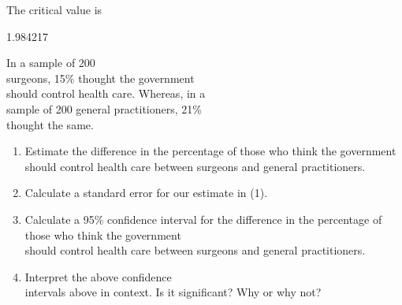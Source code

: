 \documentclass[11pt, chapterprefix=true]{scrbook}\usepackage[]{graphicx}\usepackage[]{color}
\begin{document}
\begin{exercises}
\begin{solution}
   The critical value is


  1.984217

  \end{solution}

  \begin{exercise} %

In a sample of 200 \\ surgeons, 15\% thought the government \\ should control health care.  Whereas, in a \\ sample of 200 general practitioners, 21\% \\ thought the same.

\begin{enumerate}
\item Estimate the difference in the percentage of those who think the government should control health care between surgeons and general practitioners.
\item Calculate a standard error for our estimate in (1).
\item Calculate a 95\% confidence interval for the difference in the percentage of \\ those  who think the government \\ should control health care between surgeons and general practitioners.
\item Interpret the above confidence \\ intervals above in context.  Is it significant? Why or why not?
\end{enumerate}
  \end{exercise}



\end{exercises}
\end{document}
